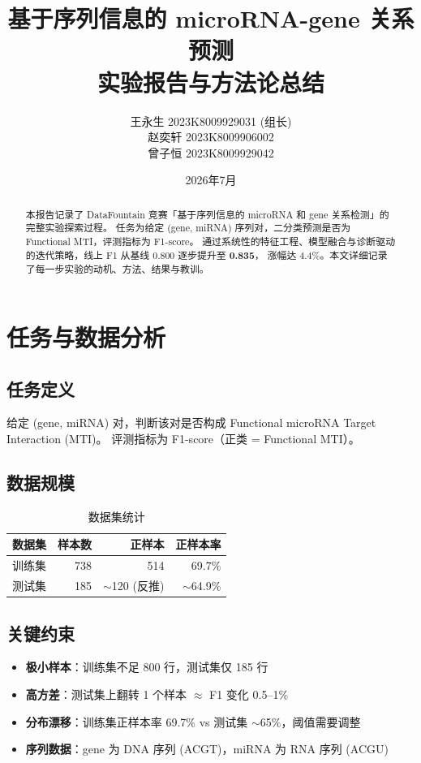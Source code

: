 \documentclass[11pt,a4paper]{article}
\title{\textbf{基于序列信息的 microRNA-gene 关系预测} \\ \large 实验报告与方法论总结}
\author{
    王永生 \quad 2023K8009929031 \quad (组长) \\
    赵奕轩 \quad 2023K8009906002 \\
    曾子恒 \quad 2023K8009929042
}
\date{2026年7月}
\begin{document}
\maketitle

\begin{abstract}
本报告记录了 DataFountain 竞赛「基于序列信息的 microRNA 和 gene 关系检测」的完整实验探索过程。
任务为给定 (gene, miRNA) 序列对，二分类预测是否为 Functional MTI，评测指标为 F1-score。
通过系统性的特征工程、模型融合与诊断驱动的迭代策略，线上 F1 从基线 0.800 逐步提升至 \textbf{0.835}，
涨幅达 4.4\%。本文详细记录了每一步实验的动机、方法、结果与教训。
\end{abstract}

\tableofcontents
\newpage

\section{任务与数据分析}

\subsection{任务定义}

给定 (gene, miRNA) 对，判断该对是否构成 Functional microRNA Target Interaction (MTI)。
评测指标为 F1-score（正类 = Functional MTI）。

\subsection{数据规模}

\begin{table}[H]
\centering
\caption{数据集统计}
\begin{tabular}{lrrr}
\toprule
数据集 & 样本数 & 正样本 & 正样本率 \\
\midrule
训练集 & 738 & 514 & 69.7\% \\
测试集 & 185 & $\sim$120 (反推) & $\sim$64.9\% \\
\bottomrule
\end{tabular}
\end{table}

\subsection{关键约束}

\begin{itemize}[nosep]
    \item \textbf{极小样本}：训练集不足 800 行，测试集仅 185 行
    \item \textbf{高方差}：测试集上翻转 1 个样本 $\approx$ F1 变化 0.5--1\%
    \item \textbf{分布漂移}：训练集正样本率 69.7\% vs 测试集 $\sim$65\%，阈值需要调整
    \item \textbf{序列数据}：gene 为 DNA 序列 (ACGT)，miRNA 为 RNA 序列 (ACGU)
\end{itemize}
\end{document}
